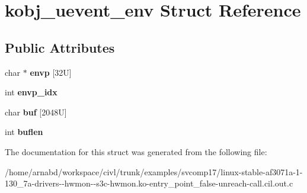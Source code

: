 \hypertarget{structkobj__uevent__env}{}\section{kobj\+\_\+uevent\+\_\+env Struct Reference}
\label{structkobj__uevent__env}
\subsection*{Public Attributes}
\begin{DoxyCompactItemize}
\item 
\hypertarget{structkobj__uevent__env_a10e126f07ca6f84ae72f22d17af9cfd6}{}char $\ast$ {\bfseries envp} \mbox{[}32\+U\mbox{]}\label{structkobj__uevent__env_a10e126f07ca6f84ae72f22d17af9cfd6}

\item 
\hypertarget{structkobj__uevent__env_a6194eba7975c7e72477de098547713df}{}int {\bfseries envp\+\_\+idx}\label{structkobj__uevent__env_a6194eba7975c7e72477de098547713df}

\item 
\hypertarget{structkobj__uevent__env_ac6e9503f009784737451b0e3ecfb9ae1}{}char {\bfseries buf} \mbox{[}2048\+U\mbox{]}\label{structkobj__uevent__env_ac6e9503f009784737451b0e3ecfb9ae1}

\item 
\hypertarget{structkobj__uevent__env_ab7e939493abe9b2b5419c1c36d8b215d}{}int {\bfseries buflen}\label{structkobj__uevent__env_ab7e939493abe9b2b5419c1c36d8b215d}

\end{DoxyCompactItemize}


The documentation for this struct was generated from the following file\+:\begin{DoxyCompactItemize}
\item 
/home/arnabd/workspace/civl/trunk/examples/svcomp17/linux-\/stable-\/af3071a-\/1-\/130\+\_\+7a-\/drivers-\/-\/hwmon-\/-\/s3c-\/hwmon.\+ko-\/entry\+\_\+point\+\_\+false-\/unreach-\/call.\+cil.\+out.\+c\end{DoxyCompactItemize}
